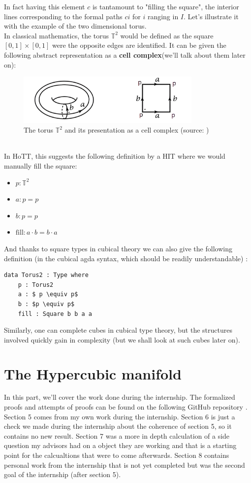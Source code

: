 \documentclass{report}
\begin{document}
In fact having this element $c$ is tantamount to "filling the square", the interior lines corresponding to the formal paths $c i$ for $i$ ranging in $I$. Let's illustrate it with the example of the two dimensional torus.\\ 
In classical mathematics, the torus $\mathbb{T}^2$ would be defined as the square $[0,1]\times[0,1]$ were the opposite edges are identified. It can be given the following abstract representation as a \textbf{cell complex}(we'll talk about them  later on):
\begin{figure}[h]
  \begin{center}
    \includegraphics[height= 2.5cm]{torus.png}
    \caption{The torus $\mathbb{T}^2$ and its presentation as a cell complex (source: \cite{hatcher})}
    \label{fig:torus}
  \end{center}
\end{figure}
\\
In HoTT, this suggests the following definition by a HIT where we would manually fill the square:
\begin{itemize}
  \item $ p : \mathbb{T}^2$
  \item $a : p = p$
  \item $b : p = p $
  \item $\mathrm{fill} :  a \cdot b = b \cdot a$
\end{itemize}
And thanks to square types in cubical theory we can also give the following definition (in the cubical agda syntax, which should be readily understandable) : 
\begin{lstlisting}[mathescape=true]
    data Torus2 : Type where
    p : Torus2
    a : $ p \equiv p$
    b : $p \equiv p$
    fill : Square b b a a
\end{lstlisting}
Similarly, one can complete cubes in cubical type theory, but the structures involved quickly gain in complexity (but we shall look at such cubes later on).
\chapter{The Hypercubic manifold} 
In this part, we'll cover the work done during the internship. The formalized proofs and attempts of proofs can be found on the following GitHub repository \cite{repo}. Section 5 comes from my own work during the internship. Section 6 is just a check we made during the internship about the coherence of section 5, so it contains no new result. Section 7 was a more in depth calculation of a side question my advisors had on a object they are working and that is a starting point for the calcualtions that were to come afterwards. Section 8 contains personal work from the internship that is not yet completed but was the second goal of the internship (after section 5).
\end{document}
